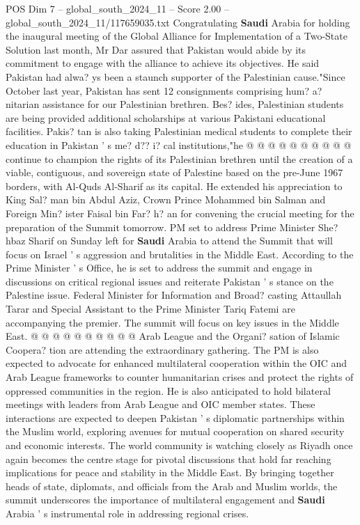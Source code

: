 \begin{textsample}{POS Dim 7 – global\_south\_2024\_11 – Score 2.00 – global\_south\_2024\_11/117659035.txt}
Congratulating \textbf{Saudi} Arabia for holding the inaugural meeting of the Global Alliance for Implementation of a Two-State Solution last month, Mr Dar assured that Pakistan would abide by its commitment to engage with the alliance to achieve its objectives.
He said Pakistan had alwa? ys been a staunch supporter of the Palestinian cause."Since October last year, Pakistan has sent 12 consignments comprising hum? a? nitarian assistance for our Palestinian brethren.
Bes? ides, Palestinian students are being provided additional scholarships at various Pakistani educational facilities.
Pakis? tan is also taking Palestinian medical students to complete their education in Pakistan ' s me? d?? i? cal institutions,"he @ @ @ @ @ @ @ @ @ @ continue to champion the rights of its Palestinian brethren until the creation of a viable, contiguous, and sovereign state of Palestine based on the pre-June 1967 borders, with Al-Quds Al-Sharif as its capital.
He extended his appreciation to King Sal? man bin Abdul Aziz, Crown Prince Mohammed bin Salman and Foreign Min? ister Faisal bin Far? h? an for convening the crucial meeting for the preparation of the Summit tomorrow.
PM set to address Prime Minister She? hbaz Sharif on Sunday left for \textbf{Saudi} Arabia to attend the Summit that will focus on Israel ' s aggression and brutalities in the Middle East.
According to the Prime Minister ' s Office, he is set to address the summit and engage in discussions on critical regional issues and reiterate Pakistan ' s stance on the Palestine issue.
Federal Minister for Information and Broad? casting Attaullah Tarar and Special Assistant to the Prime Minister Tariq Fatemi are accompanying the premier.
The summit will focus on key issues in the Middle East. @ @ @ @ @ @ @ @ @ @ Arab League and the Organi? sation of Islamic Coopera? tion are attending the extraordinary gathering.
The PM is also expected to advocate for enhanced multilateral cooperation within the OIC and Arab League frameworks to counter humanitarian crises and protect the rights of oppressed communities in the region.
He is also anticipated to hold bilateral meetings with leaders from Arab League and OIC member states.
These interactions are expected to deepen Pakistan ' s diplomatic partnerships within the Muslim world, exploring avenues for mutual cooperation on shared security and economic interests.
The world community is watching closely as Riyadh once again becomes the centre stage for pivotal discussions that hold far reaching implications for peace and stability in the Middle East.
By bringing together heads of state, diplomats, and officials from the Arab and Muslim worlds, the summit underscores the importance of multilateral engagement and \textbf{Saudi} Arabia ' s instrumental role in addressing regional crises.

\end{textsample}
